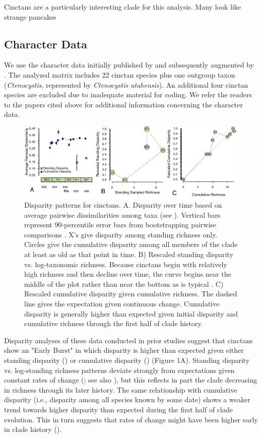 \documentclass{article}
\begin{document}
Cinctans are a particularly interesting clade for this analysis.
Many look like strange pancakes 
\subsection{Character Data}
We use the character data initially published by \citep{Smith2009} and subsequently augmented by \citep{Zamora2013}.  The analyzed matrix includes 22 cinctan species plus one outgroup taxon (\textit{Ctenocystis}, represented by \textit{Ctenocystis utahensis}). An additional four cinctan species are excluded due to inadequate material for coding.  We refer the readers to the papers cited above for additional information concerning the character data.

\begin{figure}
  \includegraphics[width=\textwidth]{figures/Cinctan Disparity 3Ways Horizontal.pdf}

  \caption{Disparity patterns for cinctans.  A. Disparity over time based on average pairwise dissimilarities among taxa (see \citep{Foote1992}).  Vertical bars represent 90-percentile error bars from bootstrapping pairwise comparisons \citep{Foote1993}.  X’s give disparity among standing richness only.  Circles give the cumulative disparity among all members of the clade at least as old as that point in time.  B) Rescaled standing disparity vs. log-taxonomic richness. Because cinctans begin with relatively high richness and then decline over time, the curve begins near the middle of the plot rather than near the bottom as is typical \citep{Jablonski2020}. C) Rescaled cumulative disparity given cumulative richness.  The dashed line gives the expectation given continuous change.  Cumulative disparity is generally higher than expected given initial disparity and cumulative richness through the first half of clade history.}
\end{figure}

Disparity analyses of these data conducted in prior studies suggest that cinctans show an "Early Burst" in which disparity is higher than expected given either standing disparity (\citep{Hughes2013}) or cumulative disparity (\citep{Wagner2015}) (Figure 1A).  Standing disparity vs. log-standing richness patterns deviate strongly from expectations given constant rates of change (\citep{Jablonski2020}; see also \citep{Wright2017}), but this reflects in part the clade decreasing in richness through its later history.  The same relationship with cumulative disparity (i.e., disparity among all species known by some date) shows a weaker trend towards higher disparity than expected during the first half of clade evolution.  This in turn suggests that rates of change might have been higher early in clade history (\citep{Foote1996b}). 
\end{document}
